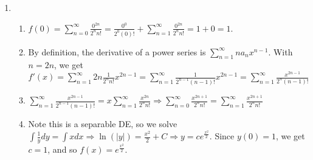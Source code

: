 \documentclass[10pt,english]{article}
\begin{document}
\begin{enumerate}
\item \begin{enumerate}
    \item $f(0)=\sum_{n=0}^\infty\frac{0^{2n}}{2^nn!}=\frac{0^0}{2^0(0)!}+\sum_{n=1}^\infty\frac{0^{2n}}{2^nn!}=1+0=1$. 
    \item By definition, the derivative of a power series is $\sum_{n=1}^\infty na_nx^{n-1}$. With $n=2n$, we get $f'(x)=\sum_{n=1}^\infty 2n\frac{1}{2^nn!}x^{2n-1}=\sum_{n=1}^\infty \frac{1}{2^{n-1}(n-1)!}x^{2n-1}=\sum_{n=1}^\infty \frac{x^{2n-1}}{2^n(n-1)!}$
    \item $\sum_{n=1}^\infty\frac{x^{2n-1}}{2^{n-1}(n-1)!}=x\sum_{n=1}^\infty\frac{x^{2n}}{2^nn!}\Rightarrow \sum_{n=0}^\infty\frac{x^{2n+1}}{2^nn!}=\sum_{n=1}^\infty\frac{x^{2n+1}}{2^nn!}$
    \item Note this is a separable DE, so we solve $\int\frac{1}{y}dy=\int xdx\Rightarrow \ln(|y|)=\frac{x^2}{2}+C\Rightarrow y=ce^{\frac{x^2}{2}}$. Since $y(0)=1$, we get $c=1$, and so $f(x)=e^{\frac{x^2}{2}}$. 
\end{enumerate}


\end{enumerate}
\end{document}
